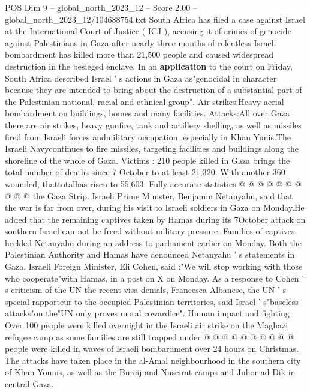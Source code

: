\begin{textsample}{POS Dim 9 – global\_north\_2023\_12 – Score 2.00 – global\_north\_2023\_12/104688754.txt}  \label{ex:f9_pos_365}
South Africa has filed a case against Israel at the International Court of Justice ( ICJ ), accusing it of crimes of genocide against Palestinians in Gaza after nearly three months of relentless Israeli bombardment has killed more than 21,500 people and caused widespread destruction in the besieged enclave.
In an \textbf{application} to the court on Friday, South Africa described Israel ' s actions in Gaza as"genocidal in character because they are intended to bring about the destruction of a substantial part of the Palestinian national, racial and ethnical group".
Air strikes:Heavy aerial bombardment on buildings, homes and many facilities.
Attacks:All over Gaza there are air strikes, heavy gunfire, tank and artillery shelling, as well as missiles fired from Israeli forces andmilitary occupation, especially in Khan Yunis.The Israeli Navycontinues to fire missiles, targeting facilities and buildings along the shoreline of the whole of Gaza.
Victims : 210 people killed in Gaza brings the total number of deaths since 7 October to at least 21,320.
With another 360 wounded, thattotalhas risen to 55,603.
Fully accurate statistics @ @ @ @ @ @ @ @ @ @ the Gaza Strip.
Israeli Prime Minister, Benjamin Netanyahu, said that the war is far from over, during his visit to Israeli soldiers in Gaza on Monday.He added that the remaining captives taken by Hamas during its 7October attack on southern Israel can not be freed without military pressure.
Families of captives heckled Netanyahu during an address to parliament earlier on Monday.
Both the Palestinian Authority and Hamas have denounced Netanyahu ' s statements in Gaza.
Israeli Foreign Minister, Eli Cohen, said :"We will stop working with those who cooperate"with Hamas, in a post on X on Monday.
As a response to Cohen ' s criticism of the UN the recent visa denials, Francesca Albanese, the UN ' s special rapporteur to the occupied Palestinian territories, said Israel ' s"baseless attacks"on the"UN only proves moral cowardice".
Human impact and fighting Over 100 people were killed overnight in the Israeli air strike on the Maghazi refugee camp as some families are still trapped under @ @ @ @ @ @ @ @ @ @ people were killed in waves of Israeli bombardment over 24 hours on Christmas.
The attacks have taken place in the al-Amal neighbourhood in the southern city of Khan Younis, as well as the Bureij and Nuseirat camps and Juhor ad-Dik in central Gaza.

\end{textsample}
